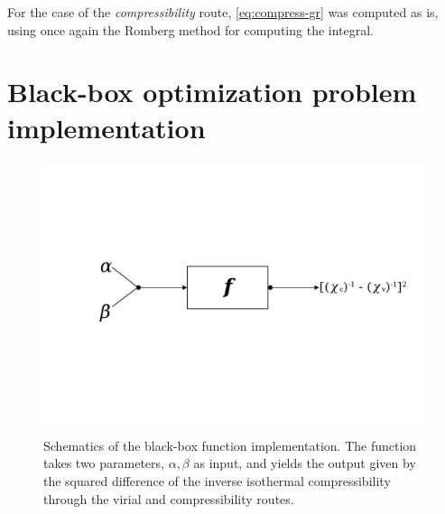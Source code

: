 For the case of the \emph{compressibility} route, \autoref{eq:compress-gr} was computed as 
is, using once again the Romberg method for computing the integral.

\section{Black-box optimization problem implementation}
\begin{figure}
    \centering
    \vspace{-2cm}
    \includegraphics[scale=0.3]{figuras/capitulo-5/black-box-function.pdf}
    \vspace{-3cm}
    \caption{Schematics of the black-box function implementation. The function takes two parameters, \(\alpha, \beta\) as input, and yields the output given by the squared difference of the inverse isothermal compressibility through the virial and compressibility routes.}
    \label{fig:black-box-function}
\end{figure}


